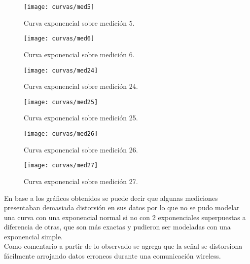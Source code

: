 \documentclass[12pt]{article}
\begin{document}
\begin{figure}[H]
\hfill
\begin{minipage}[t]{.45\textwidth}
  \centering
        \texttt{[image: curvas/med5]}
		\caption{\footnotesize Curva exponencial sobre medición 5.}
\label{fig:cmed5}
\end{minipage}
\hfill
\begin{minipage}[t]{.45\textwidth}
  \centering
        \texttt{[image: curvas/med6]}
		\caption{\footnotesize Curva exponencial sobre medición 6.}
\label{fig:cmed6}
\end{minipage}
\end{figure}

\begin{figure}[H]
\hfill
\begin{minipage}[t]{.45\textwidth}
  \centering
        \texttt{[image: curvas/med24]}
		\caption{\footnotesize Curva exponencial sobre medición 24.}
\label{fig:cmed24}
\end{minipage}
\hfill
\begin{minipage}[t]{.45\textwidth}
  \centering
        \texttt{[image: curvas/med25]}
		\caption{\footnotesize Curva exponencial sobre medición 25.}
\label{fig:cmed25}
\end{minipage}
\end{figure}

\begin{figure}[H]
\hfill
\begin{minipage}[t]{.45\textwidth}
  \centering
        \texttt{[image: curvas/med26]}
		\caption{\footnotesize Curva exponencial sobre medición 26.}
\label{fig:cmed26}
\end{minipage}
\hfill
\begin{minipage}[t]{.45\textwidth}
  \centering
        \texttt{[image: curvas/med27]}
		\caption{\footnotesize Curva exponencial sobre medición 27.}
\label{fig:cmed27}
\end{minipage}
\end{figure}

En base a los gráficos obtenidos se puede decir que algunas mediciones presentaban demasiada 
distorsión en sus datos por lo que no se pudo modelar una curva con una exponencial normal 
si no con 2 exponenciales superpuestas a diferencia de otras, que son más exactas y pudieron 
ser modeladas con una exponencial simple.\\

Como comentario a partir de lo observado se agrega que la señal se distorsiona fácilmente 
arrojando datos erroneos durante una comunicación wireless.
\end{document}
